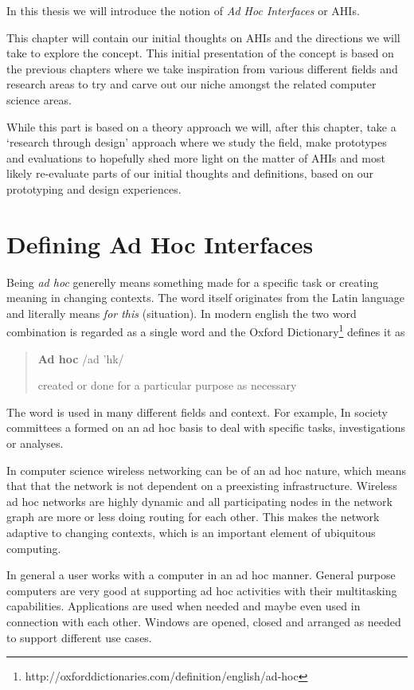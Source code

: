 
In this thesis we will introduce the notion of \emph{Ad Hoc Interfaces} or AHIs.

This chapter will contain our initial thoughts on AHIs and the directions we will take to explore the concept.
This initial presentation of the concept is based on the previous chapters where we take inspiration from various different fields and research areas to try and carve out our niche amongst the related computer science areas.

While this part is based on a theory approach we will, after this chapter, take a `research through design' approach where we study the field, make prototypes and evaluations to hopefully shed more light on the matter of AHIs and most likely re-evaluate parts of our initial thoughts and definitions, based on our prototyping and design experiences. 

\section{Defining Ad Hoc Interfaces}
Being \emph{ad hoc} generelly means something made for a specific task or creating meaning in changing contexts.
The word itself originates from the Latin language and literally means \emph{for this} (situation). 
In modern english the two word combination is regarded as a single word and the Oxford Dictionary\footnote{http://oxforddictionaries.com/definition/english/ad-hoc} defines it as

\begin{quotation}
\textbf{Ad hoc}  /ad 'h\textturnscripta k/

created or done for a particular purpose as necessary
\end{quotation}

The word is used in many different fields and context.
For example, In society committees a formed on an ad hoc basis to deal with specific tasks, investigations or analyses.

In computer science wireless networking can be of an ad hoc nature, which means that that the network is not dependent on a preexisting infrastructure.
Wireless ad hoc networks are highly dynamic and all participating nodes in the network graph are more or less doing routing for each other.
This makes the network adaptive to changing contexts, which is an important element of ubiquitous computing.

In general a user works with a computer in an ad hoc manner.
General purpose computers are very good at supporting ad hoc activities with their multitasking capabilities.
Applications are used when needed and maybe even used in connection with each other.
Windows are opened, closed and arranged as needed to support different use cases.

